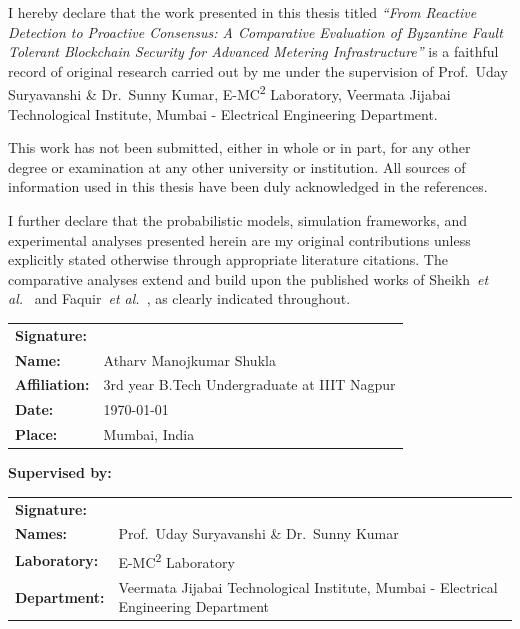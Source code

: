 \documentclass[12pt, oneside, a4paper]{report}
\theoremstyle{definition}
\theoremstyle{remark}
\begin{document}
I hereby declare that the work presented in this thesis titled \emph{``From Reactive Detection to Proactive Consensus: A Comparative Evaluation of Byzantine Fault Tolerant Blockchain Security for Advanced Metering Infrastructure''} is a faithful record of original research carried out by me under the supervision of Prof.\ Uday Suryavanshi \& Dr.\ Sunny Kumar, E-MC\textsuperscript{2} Laboratory, Veermata Jijabai Technological Institute, Mumbai - Electrical Engineering Department.

\medskip

This work has not been submitted, either in whole or in part, for any other degree or examination at any other university or institution. All sources of information used in this thesis have been duly acknowledged in the references.

\medskip

I further declare that the probabilistic models, simulation frameworks, and experimental analyses presented herein are my original contributions unless explicitly stated otherwise through appropriate literature citations. The comparative analyses extend and build upon the published works of Sheikh~\emph{et al.}~\cite{sheikh2020} and Faquir~\emph{et al.}~\cite{ids_smart_meter}, as clearly indicated throughout.

\bigskip\bigskip

\begin{tabular}{ll}
  \textbf{Signature:} & \underline{\hspace{5cm}} \\[1.0cm]
  \textbf{Name:}      & Atharv Manojkumar Shukla \\[0.4cm]
  \textbf{Affiliation:}& 3rd year B.Tech Undergraduate at IIIT Nagpur \\[0.4cm]
  \textbf{Date:}      & \today \\[0.4cm]
  \textbf{Place:}     & Mumbai, India \\
\end{tabular}

\bigskip\bigskip

\noindent\textbf{Supervised by:}

\bigskip

\begin{tabular}{ll}
  \textbf{Signature:} & \underline{\hspace{5cm}} \\[1.0cm]
  \textbf{Names:}     & Prof.\ Uday Suryavanshi \& Dr.\ Sunny Kumar \\[0.4cm]
  \textbf{Laboratory:}& E-MC\textsuperscript{2} Laboratory \\[0.4cm]
  \textbf{Department:}& Veermata Jijabai Technological Institute, Mumbai - Electrical Engineering Department \\
\end{tabular}
\end{document}

